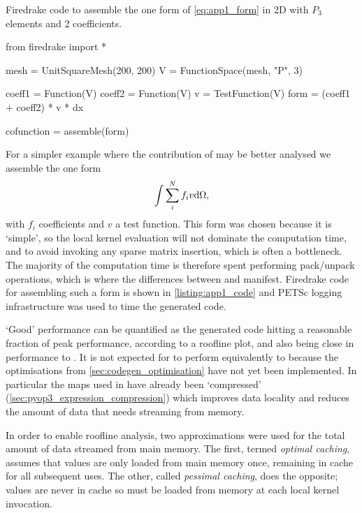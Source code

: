 \documentclass[thesis]{subfiles}
\begin{document}
\begin{listing}
  \centering
  \caption{
    Firedrake code to assemble the one form of \cref{eq:app1_form} in 2D with $P_3$ elements and 2 coefficients.
  }
  \begin{minipage}{.9\textwidth}
    \begin{pyalg2}
      from firedrake import *

      mesh = UnitSquareMesh(200, 200)
      V = FunctionSpace(mesh, "P", 3)

      coeff1 = Function(V)
      coeff2 = Function(V)
      v = TestFunction(V)
      form = (coeff1 + coeff2) * v * dx

      cofunction = assemble(form)
    \end{pyalg2}
  \end{minipage}
  \label{listing:app1_code}
\end{listing}

For a simpler example where the contribution of  may be better analysed we assemble the one form
\begin{equation}
  \label{eq:app1_form}
  \int \sum_i^N f_i v \textnormal{d}\Omega,
\end{equation}
with $f_i$ coefficients and $v$ a test function.
This form was chosen because it is `simple', so the local kernel evaluation will not dominate the computation time, and to avoid invoking any sparse matrix insertion, which is often a bottleneck.
The majority of the computation time is therefore spent performing pack/unpack operations, which is where the differences between  and  manifest.
Firedrake code for assembling such a form is shown in \cref{listing:app1_code} and PETSc logging infrastructure was used to time the generated code.

`Good' performance can be quantified as the generated code hitting a reasonable fraction of peak performance, according to a roofline plot, and also being close in performance to .
It is not expected for  to perform equivalently to  because the optimisations from \cref{sec:codegen_optimisation} have not yet been implemented.
In particular the maps used in  have already been `compressed' (\cref{sec:pyop3_expression_compression}) which improves data locality and reduces the amount of data that needs streaming from memory.

In order to enable roofline analysis, two approximations were used for the total amount of data streamed from main memory.
The first, termed \emph{optimal caching}, assumes that values are only loaded from main memory once, remaining in cache for all subsequent uses.
The other, called \emph{pessimal caching}, does the opposite; values are never in cache so must be loaded from memory at each local kernel invocation.
\end{document}
